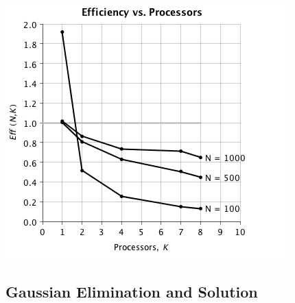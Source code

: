 \documentclass{dependencies/acm_proc_article-sp}
\begin{document}
\begin{center}
\includegraphics[scale=0.5]{images/parallel-stras/eff-vs-proc.png}
\end{center}


\subsection{Gaussian Elimination and Solution}
\end{document}
